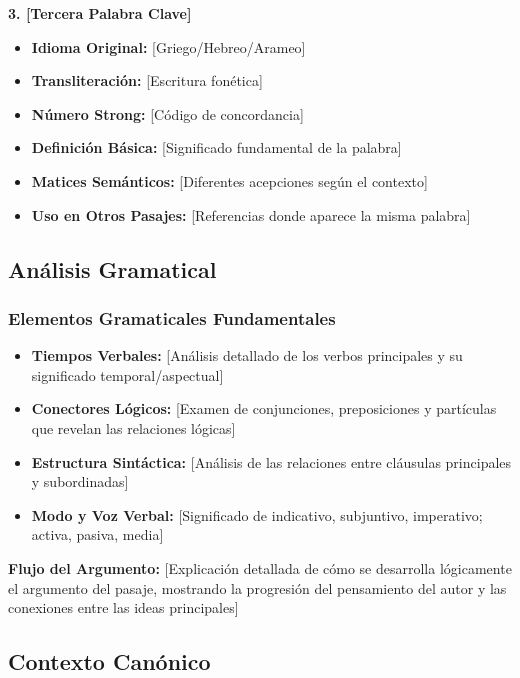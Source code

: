\documentclass[12pt,a4paper]{article}
\newcommand{\palabraclave}[1]{\textcolor{ambergold}{\textbf{#1}}}
\begin{document}
\textbf{3. \palabraclave{[Tercera Palabra Clave]}}
\begin{itemize}[leftmargin=*]
    \item \textbf{Idioma Original:} [Griego/Hebreo/Arameo]
    \item \textbf{Transliteración:} [Escritura fonética]
    \item \textbf{Número Strong:} [Código de concordancia]
    \item \textbf{Definición Básica:} [Significado fundamental de la palabra]
    \item \textbf{Matices Semánticos:} [Diferentes acepciones según el contexto]
    \item \textbf{Uso en Otros Pasajes:} [Referencias donde aparece la misma palabra]
\end{itemize}

\subsection{Análisis Gramatical}

\subsubsection{Elementos Gramaticales Fundamentales}

\begin{itemize}[leftmargin=*]
    \item \textbf{Tiempos Verbales:} [Análisis detallado de los verbos principales y su significado temporal/aspectual]
    \item \textbf{Conectores Lógicos:} [Examen de conjunciones, preposiciones y partículas que revelan las relaciones lógicas]
    \item \textbf{Estructura Sintáctica:} [Análisis de las relaciones entre cláusulas principales y subordinadas]
    \item \textbf{Modo y Voz Verbal:} [Significado de indicativo, subjuntivo, imperativo; activa, pasiva, media]
\end{itemize}

\begin{mdframed}[style=AlertBox]
\textbf{Flujo del Argumento:}
[Explicación detallada de cómo se desarrolla lógicamente el argumento del pasaje, mostrando la progresión del pensamiento del autor y las conexiones entre las ideas principales]
\end{mdframed}

\subsection{Contexto Canónico}
\end{document}
